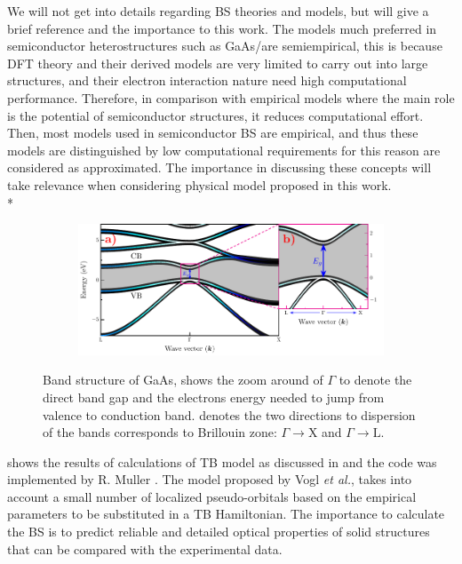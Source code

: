 We will not get into details regarding BS theories and models, but will give a brief reference and the importance to this work. The models much preferred in semiconductor heterostructures such as GaAs/\algaas are semiempirical, this is because
\gls{DFT} theory and their derived models are very limited to carry out into large structures, and
their electron interaction nature need high computational performance. Therefore, in comparison
with empirical models where the main role is the potential of semiconductor structures, it reduces computational effort.
Then, most models used in semiconductor BS are empirical, and thus these models are distinguished by low computational requirements for this reason are considered as approximated. The importance in discussing these concepts will take relevance when considering physical model proposed in this work. \\*
\begin{figure}[h!]\label{fig:subsubsection-1.1.1-GaAsbands-1}
	\centering
	\begin{subfigure}{\textwidth}
	\includegraphics[width=\linewidth]{../figures/chapter-1/bands/build/bands01}
	\label{subfig:subsubsection-1.1.1-GaAsbands-1-a)}
	\label{subfig:subsubsection-1.1.1-GaAsbands-1-b)}
\end{subfigure}
	\caption{Band structure of GaAs,  shows the zoom around of $\Gamma$  to denote the direct band gap and the electrons energy  needed to jump from valence to conduction band.  denotes the two directions to dispersion of the bands corresponds to Brillouin zone: $\Gamma\to\mathrm{X}$ and  $\Gamma\to\mathrm{L}$.\cite{fox2002optical}}
\end{figure}
 shows the results of calculations of \gls{TB} model as discussed in \cite{vogl1983asemiempirical} and the code was implemented by R. Muller \cite{rpmuller2017}. The model proposed by Vogl \textit{et al.},  takes into account a small number of localized pseudo-orbitals  based on the empirical parameters to be  substituted in a TB Hamiltonian.  The importance to calculate the BS is to  predict  reliable and detailed optical properties of solid structures that can be compared with the experimental data.

